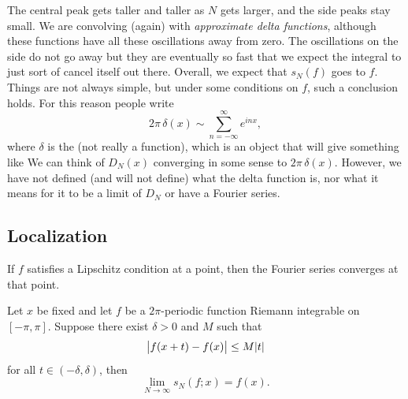 \begin{myfigureht}
\caption{Plot of $D_N(x)$ for $N=5$ (gray) and $N=20$
(black).\label{fig:approxdeltas}}
\end{myfigureht}

The central peak gets taller and taller as $N$ gets larger,
and the side peaks stay small.
We are convolving (again) with
\emph{approximate delta functions},
although these functions have
all these oscillations away from zero.  The oscillations on the side do not go away
but they are eventually so fast that we expect the integral to just sort of
cancel itself out there.
Overall, we expect that
$s_N(f)$ goes to $f$.  Things are not always simple,
but under some conditions on $f$, such a conclusion holds.  For this reason
people write
\begin{equation*}
2\pi \, \delta(x) \sim \sum_{n=-\infty}^\infty e^{inx} ,
\end{equation*}
where $\delta$ is the  (not really a function),
which is an object that will give something like
We can think of $D_N(x)$ converging in some sense to $2 \pi\, \delta(x)$.
However, we have not defined (and will not define) what the delta function
is, nor what it means for it to be a limit of $D_N$ or have a Fourier series.

\subsection{Localization}

If $f$ satisfies a Lipschitz condition at a point, then
the Fourier series converges at that point.

\begin{thm} \label{thm:fourierlocalization}
Let $x$ be fixed and let $f$ be a $2\pi$-periodic function
Riemann integrable on $[-\pi,\pi]$.  Suppose
there exist $\delta > 0$ and $M$ such that
\begin{equation*}
\bigl\lvert {f(x+t)-f(x)} \bigr\rvert \leq M \lvert {t} \rvert
\end{equation*}
for all $t \in (-\delta,\delta)$, then
\begin{equation*}
\lim_{N \to \infty} s_N(f;x) = f(x) .
\end{equation*}
\end{thm}

